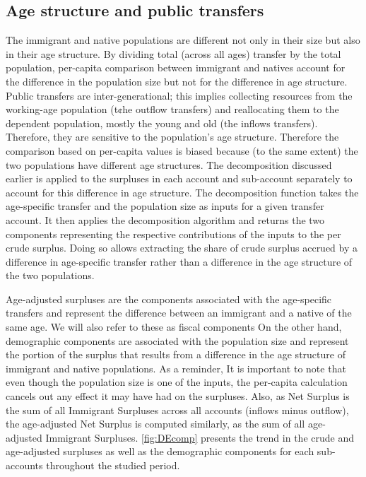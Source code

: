 \subsection{Age structure and public transfers}
The immigrant and native populations are different not only in their size but also in their age structure.
By dividing total (across all ages) transfer by the total population, per-capita comparison between immigrant and natives account for the difference in the population size but not for the difference in age structure.
Public transfers are inter-generational; this implies collecting resources from the working-age population (t¢he outflow transfers) and reallocating them to the dependent population, mostly the young and old (the inflows transfers). Therefore, they are sensitive to the population's age structure.
Therefore the comparison based on per-capita values is biased because (to the same extent) the two populations have different age structures.
The decomposition discussed earlier is applied to the surpluses in each account and sub-account separately to account for this difference in age structure.
The decomposition function takes the age-specific transfer and the population size as inputs for a given transfer account. It then applies the decomposition algorithm and returns the two components representing the respective contributions of the inputs to the per crude surplus.
Doing so allows extracting the share of crude surplus accrued by a difference in age-specific transfer rather than a difference in the age structure of the two populations.

\vspace{0.7em}\par
Age-adjusted surpluses are the components associated with the age-specific transfers and represent the difference between an immigrant and a native of the same age.
We will also refer to these as fiscal components
On the other hand, demographic components are associated with the population size and represent the portion of the surplus that results from a difference in the age structure of immigrant and native populations.
As a reminder,
It is important to note that even though the population size is one of the inputs, the per-capita calculation cancels out any effect it may have had on the surpluses.
Also, as Net Surplus is the sum of all Immigrant Surpluses across all accounts (inflows minus outflow), the age-adjusted Net Surplus is computed similarly, as the sum of all age-adjusted Immigrant Surpluses. \autoref{fig:DEcomp} presents the trend in the crude and age-adjusted surpluses as well as the demographic components for each sub-accounts throughout the studied period.

